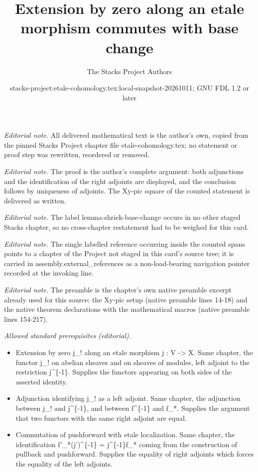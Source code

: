 \documentclass[10pt,a4paper]{amsart}
\title{Extension by zero along an etale morphism commutes with base change}
\author{The Stacks Project Authors}
\date{stacks-project:etale-cohomology.tex:local-snapshot-20261011; GNU FDL 1.2 or later}
\theoremstyle{plain}
\theoremstyle{definition}
\theoremstyle{remark}
\numberwithin{equation}{subsection}
\begin{document}
\maketitle
\noindent\textit{Editorial note.} All delivered mathematical text is the author's own, copied from the pinned Stacks Project chapter file etale-cohomology.tex; no statement or proof step was rewritten, reordered or removed.\par\medskip
\noindent\textit{Editorial note.} The proof is the author's complete argument: both adjunctions and the identification of the right adjoints are displayed, and the conclusion follows by uniqueness of adjoints. The Xy-pic square of the counted statement is delivered as written.\par\medskip
\noindent\textit{Editorial note.} The label lemma-shriek-base-change occurs in no other staged Stacks chapter, so no cross-chapter restatement had to be weighed for this card.\par\medskip
\noindent\textit{Editorial note.} The single labelled reference occurring inside the counted spans points to a chapter of the Project not staged in this card's source tree; it is carried in assembly.external\_references as a non-load-bearing navigation pointer recorded at the invoking line.\par\medskip
\noindent\textit{Editorial note.} The preamble is the chapter's own native preamble excerpt already used for this source: the Xy-pic setup (native preamble lines 14-18) and the native theorem declarations with the mathematical macros (native preamble lines 154-217).\par\medskip
\noindent\textit{Allowed standard prerequisites (editorial).}\begin{itemize}
\item Extension by zero j\_! along an etale morphism j : V -> X. Same chapter, the functor j\_! on abelian sheaves and on sheaves of modules, left adjoint to the restriction j\textasciicircum{}\{-1\}. Supplies the functors appearing on both sides of the asserted identity.
\item Adjunction identifying j\_! as a left adjoint. Same chapter, the adjunction between j\_! and j\textasciicircum{}\{-1\}, and between f\textasciicircum{}\{-1\} and f\_*. Supplies the argument that two functors with the same right adjoint are equal.
\item Commutation of pushforward with etale localization. Same chapter, the identification f'\_*(j')\textasciicircum{}\{-1\} = j\textasciicircum{}\{-1\}f\_* coming from the construction of pullback and pushforward. Supplies the equality of right adjoints which forces the equality of the left adjoints.
\end{itemize}\medskip
\end{document}
